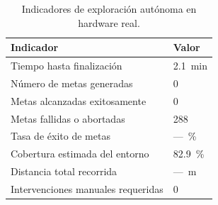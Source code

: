 \begin{table}[H]
\centering
\caption{Indicadores de exploración autónoma en hardware real.}
\label{tab:explore_real}
\begin{tabular}{ll}
\hline
\textbf{Indicador} & \textbf{Valor} \\
\hline
Tiempo hasta finalización          & 2.1~min \\
Número de metas generadas          & 0 \\
Metas alcanzadas exitosamente      & 0 \\
Metas fallidas o abortadas         & 288 \\
Tasa de éxito de metas             & ---~\% \\
Cobertura estimada del entorno     & 82.9~\% \\
Distancia total recorrida          & ---~m \\
Intervenciones manuales requeridas & 0 \\
\hline
\end{tabular}
\end{table}

